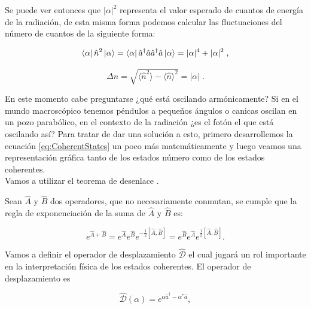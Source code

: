     Se puede ver entonces que $|\alpha|^2$ representa el valor esperado de cuantos de energía de la radiación, de esta misma forma podemos calcular las fluctuaciones del número de cuantos de la siguiente forma:

    \begin{equation}
        \bra{\alpha}\hat{n}^2\ket{\alpha} = \bra{\alpha}\hat{a}^{\dagger}\hat{a}\hat{a}^{\dagger}\hat{a}\ket{\alpha} = |\alpha|^4 + |\alpha|^2\;,
    \end{equation}

    \begin{equation}\label{eq:deltaEnexd}
        \Delta n = \sqrt{\langle \hat{n}^2 \rangle - \langle \hat{n} \rangle ^2} = |\alpha|\;.
    \end{equation}
    

    En este momento cabe preguntarse ¿qué está oscilando armónicamente? Si en el mundo macroscópico tenemos péndulos a pequeños ángulos o canicas oscilan en un pozo parabólico, en el contexto de la radiación ¿es el fotón el que está oscilando así? Para tratar de dar una solución a esto, primero desarrollemos la ecuación \ref{eq:CoherentStates} un poco más matemáticamente y luego veamos una representación gráfica tanto de los estados número como de los estados coherentes.\\

    Vamos a utilizar el teorema de desenlace \cite{sakurai1995modern}.

    \begin{myteo}\label{teo:Desenlace}
        Sean $\hat{A}$ y $\hat{B}$ dos operadores, que no necesariamente conmutan, se cumple que la regla de exponenciación de la suma de $\hat{A}$ y $\hat{B}$ es:

        \begin{equation}
            e^{\hat{A} + \hat{B}} = e^{\hat{A}}e^{\hat{B}}e^{-\frac{1}{2}[\hat{A},\hat{B}]} = e^{\hat{B}}e^{\hat{A}}e^{\frac{1}{2}[\hat{A},\hat{B}]}.
        \end{equation}

    \end{myteo}

    Vamos a definir el operador de desplazamiento $\hat{\mathcal{D}}$ el cual jugará un rol importante en la interpretación física de los estados coherentes. El operador de desplazamiento es

    \begin{equation}
        \hat{\mathcal{D}}(\alpha) = e^{\alpha\hat{a}^{\dagger} - \alpha^*\hat{a}},
    \end{equation}

